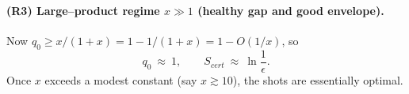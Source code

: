 \documentclass[a4paper,unpublished,onecolumn,11pt]{quantumarticle}
\theoremstyle{definition}
\theoremstyle{remark}
\begin{document}
\paragraph{(R3) Large–product regime \(x\gg 1\) (healthy gap and good envelope).}
Now \(q_0\ge x/(1+x)=1-1/(1+x)=1-O(1/x)\), so
\begin{equation}
\label{eq:regime-large}
q_0\ \approx\ 1,
\qquad
S_{cert}\ \approx\ \ln\frac{1}{\epsilon}.
\end{equation}
Once \(x\) exceeds a modest constant (say \(x\gtrsim 10\)), the shots are essentially optimal.














\end{document}
